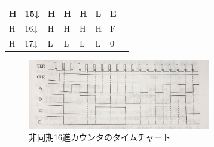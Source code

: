\documentclass[a4paper, 11pt, uplatex]{jsarticle}
\begin{document}
\begin{table}[H]
\begin{center}
\begin{tabular}{|l|l|l|l|l|l|l|l|}
H                                                                 & 15↓                                                               & H                                                               & H                                                               & H                                                               & L                                                               & E                                                                       &                     \\ \hline
H                                                                 & 16↓                                                               & H                                                               & H                                                               & H                                                               & H                                                               & F                                                                       &                     \\ \hline
H                                                                 & 17↓                                                               & L                                                               & L                                                               & L                                                               & L                                                               & 0                                                                       &                     \\ \hline
\end{tabular}
\end{center}
\end{table}

\begin{figure}[H]
  \begin{center}
    \includegraphics[width = 8cm]{画像/カウンタタイムチャート.jpg}
    \caption{非同期16進カウンタのタイムチャート}
    \label{カウンタタイムチャート}
  \end{center}
\end{figure}
\end{document}
